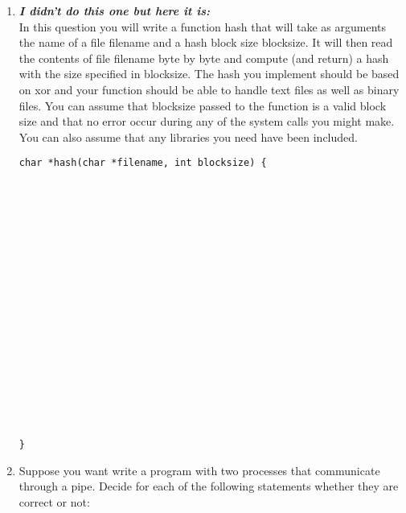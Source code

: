 \documentclass[11pt]{article}
\begin{document}
\begin{enumerate}
	\newpage
	\item \textbf{\textit{I didn't do this one but here it is:}}\\
		In this question you will write a function hash that will take as arguments the name of a file filename and a hash block size blocksize. It will then read the contents of file filename byte by byte and compute (and return) a hash with the size specified in blocksize. The hash you implement should be based on xor and your function should be able to handle text files as well as binary files. You can assume that blocksize passed to the function is a valid block size and that no error occur during any of the system calls you might make. You can also assume that any libraries you need have been included.\\
		\begin{Verbatim}
char *hash(char *filename, int blocksize) {




















}
		\end{Verbatim}

	\newpage
	\item Suppose you want write a program with two processes that communicate through a pipe. Decide for each of the following statements whether they are correct or not:\\


\end{enumerate}
\end{document}
